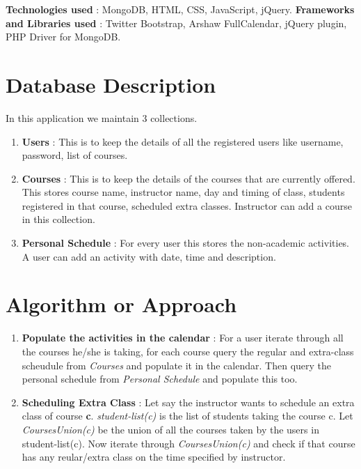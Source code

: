 \documentclass[twocolumn]{article}
\newcommand{\comment}[1]{}
\begin{document}
\textbf{Technologies used} : MongoDB, HTML, CSS, JavaScript, jQuery.
\newline
\textbf{Frameworks and Libraries used} : Twitter Bootstrap, Arshaw FullCalendar, jQuery plugin, PHP Driver for MongoDB.
\comment{

Can also comment out paragraphs, etc.

}
\section{Database Description}
In this application we maintain 3 collections. 

\begin{enumerate}
  \item \textbf{Users} : This is to keep the details of all the registered users like username, password, list of courses.
  \item \textbf{Courses} : This is to keep the details of the courses that are currently offered. This stores course name, instructor name, day and timing of class, students registered in that course, scheduled extra classes. Instructor can add a course in this collection.
  \item \textbf{Personal Schedule} : For every user this stores the non-academic activities. A user can add an activity with date, time and description.

\end{enumerate}

\section{Algorithm or Approach}
\begin{enumerate}
\item \textbf{Populate the activities in the calendar} : For a user iterate through all the courses he/she is taking, for each course query the regular and extra-class scheudule from \emph{Courses} and populate it in the calendar. Then query the personal schedule from \emph{Personal Schedule} and populate this too.  
\item \textbf{Scheduling Extra Class} : Let say the instructor wants to schedule an extra class of course \textbf{c}. \emph{student-list(c)} is the list of students taking the course c. Let \emph{CoursesUnion(c)} be the union of all the courses taken by the users in student-list(c). Now iterate through \emph{CoursesUnion(c)}  and check if that course has any reular/extra class on the time specified by instructor.\\

\end{enumerate}
\end{document}
